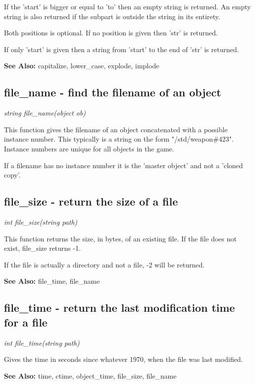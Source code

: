     If the 'start' is bigger or equal to 'to' then an empty string is
    returned. An empty string is also returned if the subpart is
    outside the string in its entirety.

    Both positions is optional. If no position is given then 'str' is
    returned.

    If only 'start' is given then a string from 'start' to the end of
    'str' is returned.

    {\bf See Also: }    capitalize, lower\_case, explode, implode


\subsection{file\_name - find the filename of an object}

    {\em string file\_name(object ob)}

    This function gives the filename of an object concatenated with
    a possible instance number. This typically is a string on the
    form "/std/weapon\#423". Instance numbers are unique for all
    objects in the game.

    If a filename has no instance number it is the 'master object' and
    not a 'cloned copy'. 



\subsection{file\_size - return the size of a file}

    {\em int file\_size(string path)}

    This function returns the size, in bytes, of an existing file. If the
    file does not exist, file\_size returns -1.

    If the file is actually a directory and not a file, -2 will be
    returned.

    {\bf See Also: }    file\_time, file\_name



\subsection{file\_time - return the last modification time for a file}

    {\em int file\_time(string path)}

    Gives the time in seconds since whatever 1970, when the file was last
    modified. 
    
    {\bf See Also: }    time, ctime, object\_time, file\_size, file\_name



